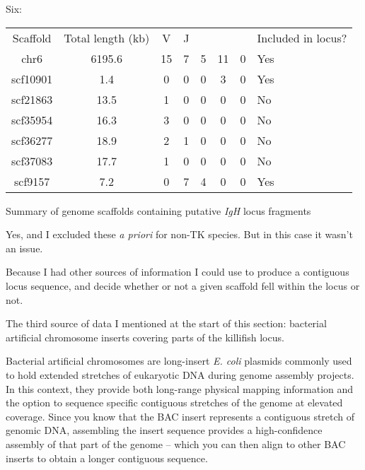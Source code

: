 
Six:

\begin{threeparttable}
\begin{tabular}{ccccccc}\toprule
Scaffold & Total length (kb) & V & J & \cm{} & \cd{} & \cz{} & Included in locus?\\
chr6 & 6195.6 & 15 & 7 & 5 & 11 & 0 & Yes\\
scf10901 & 1.4 & 0 & 0 & 0 & 3 & 0 & Yes\\
scf21863 & 13.5 & 1 & 0 & 0 & 0 & 0 & No\\
scf35954 & 16.3 & 3 & 0 & 0 & 0 & 0 & No\\
scf36277 & 18.9 & 2 & 1 & 0 & 0 & 0 & No\\
scf37083 & 17.7 & 1 & 0 & 0 & 0 & 0 & No\\
scf9157 & 7.2 & 0 & 7 & 4 & 0 & 0 & Yes\\
\end{tabular}
\caption{Summary of genome scaffolds containing putative \textit{IgH} locus fragments}
\end{threeparttable}


Yes, and I excluded these \textit{a priori} for non-TK species. But in this case it wasn't an issue.


Because I had other sources of information I could use to produce a contiguous locus sequence, and decide whether or not a given scaffold fell within the locus or not.


The third source of data I mentioned at the start of this section: bacterial artificial chromosome inserts covering parts of the killifish locus.


Bacterial artificial chromosomes are long-insert \textit{E. coli} plasmids commonly used to hold extended stretches of eukaryotic DNA during genome assembly projects. In this context, they provide both long-range physical mapping information and the option to sequence specific contiguous stretches of the genome at elevated coverage. Since you know that the BAC insert represents a contiguous stretch of genomic DNA, assembling the insert sequence provides a high-confidence assembly of that part of the genome -- which you can then align to other BAC inserts to obtain a longer contiguous sequence.

